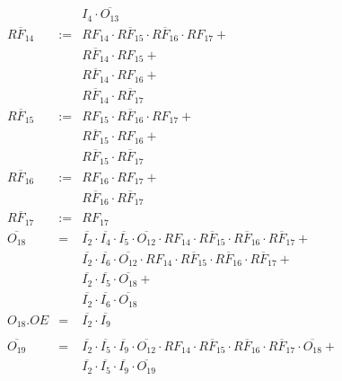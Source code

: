 \documentclass[a4paper,russian]{report}
\begin{document}
\begin{eqnarray*}
	& &  I_{4} \cdotp \overline{O_{13}} \\
    \overline{RF_{14}} & := & RF_{14} \cdotp \overline{RF_{15}} \cdotp \overline{RF_{16}} \cdotp RF_{17} + \\
	& &  \overline{RF_{14}} \cdotp RF_{15} + \\
	& &  \overline{RF_{14}} \cdotp RF_{16} + \\
	& &  \overline{RF_{14}} \cdotp \overline{RF_{17}} \\
    \overline{RF_{15}} & := & RF_{15} \cdotp \overline{RF_{16}} \cdotp RF_{17} + \\
	& &  \overline{RF_{15}} \cdotp RF_{16} + \\
	& &  \overline{RF_{15}} \cdotp \overline{RF_{17}} \\
    \overline{RF_{16}} & := & RF_{16} \cdotp RF_{17} + \\
	& &  \overline{RF_{16}} \cdotp \overline{RF_{17}} \\
    \overline{RF_{17}} & := & RF_{17} \\
    \overline{O_{18}} & = & \overline{I_{2}} \cdotp \overline{I_{4}} \cdotp \overline{I_{5}} \cdotp \overline{O_{12}} \cdotp RF_{14} \cdotp \overline{RF_{15}} \cdotp \overline{RF_{16}} \cdotp \overline{RF_{17}} + \\
	& &  \overline{I_{2}} \cdotp \overline{I_{6}} \cdotp \overline{O_{12}} \cdotp RF_{14} \cdotp \overline{RF_{15}} \cdotp \overline{RF_{16}} \cdotp \overline{RF_{17}} + \\
	& &  \overline{I_{2}} \cdotp \overline{I_{5}} \cdotp \overline{O_{18}} + \\
	& &  \overline{I_{2}} \cdotp \overline{I_{6}} \cdotp \overline{O_{18}} \\
    O_{18}.OE & = & \overline{I_{2}} \cdotp \overline{I_{9}} \\ \\
    \overline{O_{19}} & = & \overline{I_{2}} \cdotp \overline{I_{5}} \cdotp \overline{I_{9}} \cdotp \overline{O_{12}} \cdotp RF_{14} \cdotp \overline{RF_{15}} \cdotp \overline{RF_{16}} \cdotp \overline{RF_{17}} \cdotp \overline{O_{18}} + \\
	& &  \overline{I_{2}} \cdotp \overline{I_{5}} \cdotp \overline{I_{9}} \cdotp \overline{O_{19}} \\
 \end{eqnarray*}
\pagebreak[1]
\end{document}

